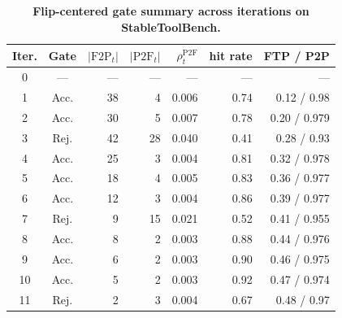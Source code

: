
\begin{table}[t]
\centering
\small
\setlength{\tabcolsep}{3pt}
\renewcommand{\arraystretch}{1.12}
\caption{\textbf{Flip-centered gate summary across iterations on StableToolBench.}}
\label{tab:gate-summary}

\begin{tabularx}{\linewidth}{@{}c c r r r r r@{}}
\toprule
Iter. &
Gate &
$\lvert \mathrm{F2P}_t \rvert$ &
$\lvert \mathrm{P2F}_t \rvert$ &
$\rho^{\mathrm{P2F}}_t$ &
hit rate &
\textbf{FTP / P2P} \\
\midrule

0 & --- & --- & --- & --- & --- & --- \\

1 & Acc. & 38 & 4  & 0.006 & 0.74 & 0.12 / 0.98 \\
2 & Acc. & 30 & 5  & 0.007 & 0.78 & 0.20 / 0.979 \\
3 & Rej. & 42 & 28 & 0.040 & 0.41 & 0.28 / 0.93 \\
4 & Acc. & 25 & 3  & 0.004 & 0.81 & 0.32 / 0.978 \\
5 & Acc. & 18 & 4  & 0.005 & 0.83 & 0.36 / 0.977 \\
6 & Acc. & 12 & 3  & 0.004 & 0.86 & 0.39 / 0.977 \\
7 & Rej. & 9  & 15 & 0.021 & 0.52 & 0.41 / 0.955 \\
8 & Acc. & 8  & 2  & 0.003 & 0.88 & 0.44 / 0.976 \\
9 & Acc. & 6  & 2  & 0.003 & 0.90 & 0.46 / 0.975 \\
10 & Acc. & 5 & 2  & 0.003 & 0.92 & 0.47 / 0.974 \\
11 & Rej. & 2 & 3  & 0.004 & 0.67 & 0.48 / 0.97 \\
\bottomrule
\end{tabularx}

\vspace{2pt}


\end{table}
